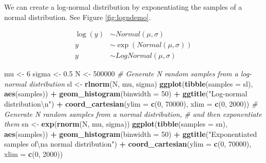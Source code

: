 \documentclass[12pt,]{krantz}
\newenvironment{Shaded}{\begin{snugshade}}{\end{snugshade}}
\newcommand{\CharTok}[1]{\textcolor[rgb]{0.31,0.60,0.02}{#1}}
\newcommand{\CommentTok}[1]{\textcolor[rgb]{0.56,0.35,0.01}{\textit{#1}}}
\newcommand{\DataTypeTok}[1]{\textcolor[rgb]{0.13,0.29,0.53}{#1}}
\newcommand{\DecValTok}[1]{\textcolor[rgb]{0.00,0.00,0.81}{#1}}
\newcommand{\FloatTok}[1]{\textcolor[rgb]{0.00,0.00,0.81}{#1}}
\newcommand{\KeywordTok}[1]{\textcolor[rgb]{0.13,0.29,0.53}{\textbf{#1}}}
\newcommand{\NormalTok}[1]{#1}
\newcommand{\OperatorTok}[1]{\textcolor[rgb]{0.81,0.36,0.00}{\textbf{#1}}}
\newcommand{\StringTok}[1]{\textcolor[rgb]{0.31,0.60,0.02}{#1}}
\theoremstyle{definition}
\theoremstyle{definition}
\theoremstyle{definition}
\theoremstyle{remark}
\begin{document}
We can create a log-normal distribution by exponentiating the samples of a normal distribution. See Figure \ref{fig:logndemo}.

\begin{equation}
\begin{aligned}
\log(y) &\sim Normal( \mu, \sigma)\\
y &\sim \exp(Normal( \mu, \sigma)) \\
y &\sim LogNormal( \mu, \sigma)
\end{aligned}
\end{equation}

\begin{Shaded}
\begin{Highlighting}[]
\NormalTok{mu <-}\StringTok{ }\DecValTok{6}
\NormalTok{sigma <-}\StringTok{ }\FloatTok{0.5}
\NormalTok{N <-}\StringTok{ }\DecValTok{500000}
\CommentTok{# Generate N random samples from a log-normal distribution}
\NormalTok{sl <-}\StringTok{ }\KeywordTok{rlnorm}\NormalTok{(N, mu, sigma)}
\KeywordTok{ggplot}\NormalTok{(}\KeywordTok{tibble}\NormalTok{(}\DataTypeTok{samples =}\NormalTok{ sl), }\KeywordTok{aes}\NormalTok{(samples)) }\OperatorTok{+}
\StringTok{  }\KeywordTok{geom_histogram}\NormalTok{(}\DataTypeTok{binwidth =} \DecValTok{50}\NormalTok{) }\OperatorTok{+}
\StringTok{  }\KeywordTok{ggtitle}\NormalTok{(}\StringTok{"Log-normal distribution}\CharTok{\textbackslash{}n}\StringTok{"}\NormalTok{) }\OperatorTok{+}
\StringTok{  }\KeywordTok{coord_cartesian}\NormalTok{(}\DataTypeTok{ylim =} \KeywordTok{c}\NormalTok{(}\DecValTok{0}\NormalTok{, }\DecValTok{70000}\NormalTok{), }\DataTypeTok{xlim =} \KeywordTok{c}\NormalTok{(}\DecValTok{0}\NormalTok{, }\DecValTok{2000}\NormalTok{))}
\CommentTok{# Generate N random samples from a normal distribution,}
\CommentTok{# and then exponentiate them}
\NormalTok{sn <-}\StringTok{ }\KeywordTok{exp}\NormalTok{(}\KeywordTok{rnorm}\NormalTok{(N, mu, sigma))}
\KeywordTok{ggplot}\NormalTok{(}\KeywordTok{tibble}\NormalTok{(}\DataTypeTok{samples =}\NormalTok{ sn), }\KeywordTok{aes}\NormalTok{(samples)) }\OperatorTok{+}
\StringTok{  }\KeywordTok{geom_histogram}\NormalTok{(}\DataTypeTok{binwidth =} \DecValTok{50}\NormalTok{) }\OperatorTok{+}
\StringTok{  }\KeywordTok{ggtitle}\NormalTok{(}\StringTok{"Exponentiated samples of}\CharTok{\textbackslash{}n}\StringTok{a normal distribution"}\NormalTok{) }\OperatorTok{+}
\StringTok{    }\KeywordTok{coord_cartesian}\NormalTok{(}\DataTypeTok{ylim =} \KeywordTok{c}\NormalTok{(}\DecValTok{0}\NormalTok{, }\DecValTok{70000}\NormalTok{), }\DataTypeTok{xlim =} \KeywordTok{c}\NormalTok{(}\DecValTok{0}\NormalTok{, }\DecValTok{2000}\NormalTok{))}
\end{Highlighting}
\end{Shaded}
\end{document}
